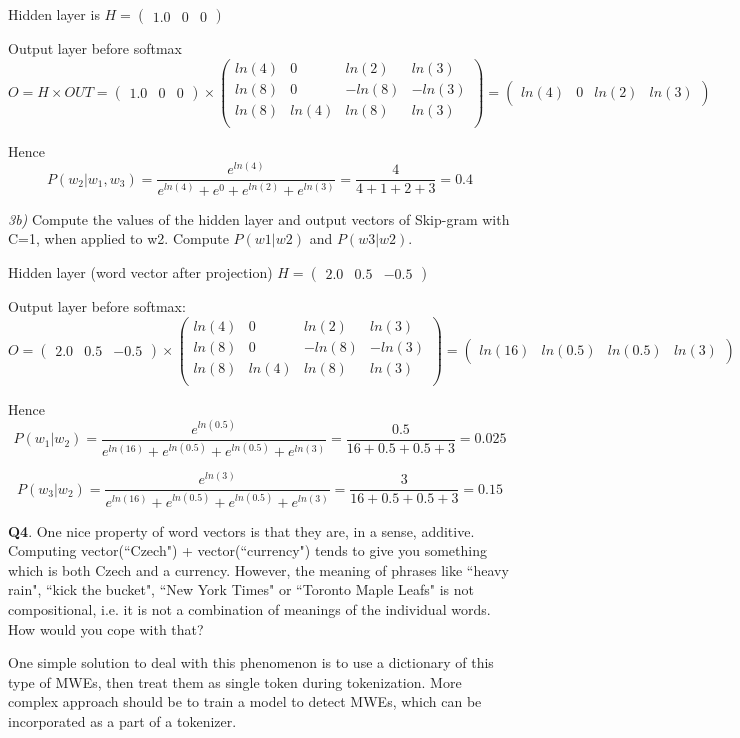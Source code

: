 \documentclass{article}
\begin{document}
Hidden layer is
$H=
  \begin{pmatrix}
    1.0 & 0 & 0
  \end{pmatrix}
$

Output layer before softmax
\[
O=H\times OUT=
  \begin{pmatrix}
    1.0 & 0 & 0
  \end{pmatrix}\times
  \begin{pmatrix}
    ln(4) & 0 & ln(2) & ln(3)\\
    ln(8) & 0 & -ln(8) & -ln(3)\\
    ln(8) & ln(4) & ln(8) & ln(3)\\
  \end{pmatrix}
  =
  \begin{pmatrix}
    ln(4) & 0 & ln(2) & ln(3)
  \end{pmatrix}
\]

Hence
\[
P(w_2|w_1,w_3)=\frac{e^{ln(4)}}{e^{ln(4)}+e^0+e^{ln(2)}+e^{ln(3)}}=\frac{4}{4+1+2+3}=0.4
\]

\textit{3b)} Compute the values of the hidden layer and output vectors of Skip-gram with C=1, when applied to w2.
Compute $P(w1|w2)$ and $P(w3|w2)$.

Hidden layer (word vector after projection)
$
H=
  \begin{pmatrix}
    2.0 &  0.5 & -0.5
  \end{pmatrix}
$

Output layer before softmax:
\[
O=
  \begin{pmatrix}
    2.0 &  0.5 & -0.5
  \end{pmatrix}\times
  \begin{pmatrix}
    ln(4) & 0 & ln(2) & ln(3)\\
    ln(8) & 0 & -ln(8) & -ln(3)\\
    ln(8) & ln(4) & ln(8) & ln(3)\\
  \end{pmatrix}
  =
  \begin{pmatrix}
    ln(16) & ln(0.5) & ln(0.5) & ln(3)
  \end{pmatrix}
\]

Hence
\[
P(w_1|w_2)=\frac{e^{ln(0.5)}}{e^{ln(16)}+e^{ln(0.5)}+e^{ln(0.5)}+e^{ln(3)}}=\frac{0.5}{16+0.5+0.5+3}=0.025
\]

\[
P(w_3|w_2)=\frac{e^{ln(3)}}{e^{ln(16)}+e^{ln(0.5)}+e^{ln(0.5)}+e^{ln(3)}}=\frac{3}{16+0.5+0.5+3}=0.15
\]

\textbf{Q4}. One nice property of word vectors is that they are, in a sense, additive. Computing vector(``Czech") + vector(``currency") tends to give you something which is both Czech and a currency. However, the meaning of phrases like ``heavy rain", ``kick the bucket", ``New York Times" or ``Toronto Maple Leafs" is not compositional, i.e. it is not a combination of meanings of the individual words. How would you cope with that?

One simple solution to deal with this phenomenon is to use a dictionary of this type of MWEs, then treat them as single token during tokenization. More complex approach should be to train a model to detect MWEs, which can be incorporated as a part of a tokenizer.
\end{document}
